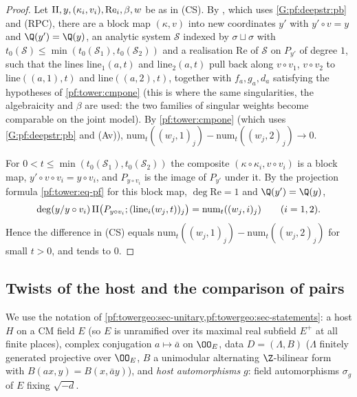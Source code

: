 \begin{proof}
Let $\mathrm{II},y,(\kappa_i,v_i),\mathrm{Re}_i,\beta,w$ be as in (CS). By
, which uses \ref{G:pf:deepstr:pb} and (RPC), there are a
block map $(\kappa,v)$ into new coordinates $y'$ with $y'\circ v=y$ and $\Q(y')=\Q(y)$, an analytic system $\mathcal S$
indexed by $\sigma\sqcup\sigma$ with $t_0(\mathcal S)\le\min(t_0(\mathcal S_1),t_0(\mathcal S_2))$ and a realisation
$\mathrm{Re}$ of $\mathcal S$ on $P_{y'}$ of degree $1$, such that the lines $\mathrm{line}_1(a,t)$ and $\mathrm{line}_2(a,t)$
pull back along $v\circ v_1$, $v\circ v_2$ to $\mathrm{line}((a,1),t)$ and $\mathrm{line}((a,2),t)$, together with $f_a,g_a,d_a$
satisfying the hypotheses of \cref{pf:tower:cmpone} (this is where the same singularities, the algebraicity and $\beta$
are used: the two families of singular weights become comparable on the joint model). By \cref{pf:tower:cmpone} (which uses \ref{G:pf:deepstr:pb} and (Av)),
$\mathrm{num}_t((w_j,1)_j)-\mathrm{num}_t((w_j,2)_j)\to0$.

For $0<t\le\min(t_0(\mathcal S_1),t_0(\mathcal S_2))$ the composite $(\kappa\circ\kappa_i,v\circ v_i)$ is a block map,
$y'\circ v\circ v_i=y\circ v_i$, and $P_{y\circ v_i}$ is the image of $P_{y'}$ under it. By the projection formula
\eqref{pf:tower:eq-pf} for this block map, $\deg\mathrm{Re}=1$ and $\Q(y')=\Q(y)$,
\[
\deg(y/y\circ v_i)\,\mathrm{II}\bigl(P_{y\circ v_i};(\mathrm{line}_i(w_j,t))_j\bigr)=\mathrm{num}_t((w_j,i)_j)\qquad(i=1,2).
\]
Hence the difference in (CS) equals $\mathrm{num}_t((w_j,1)_j)-\mathrm{num}_t((w_j,2)_j)$ for small $t>0$, and tends to $0$.
\end{proof}

\subsection{Twists of the host and the comparison of pairs}\label{pf:tower:sec-twist}

We use the notation of \cref{pf:towergeo:sec-unitary,pf:towergeo:sec-statements}: a host $H$ on a CM field $E$ (so $E$ is
unramified over its maximal real subfield $E^+$ at all finite places), complex conjugation $a\mapsto\bar a$ on $\OO_E$, data
$D=(\Lambda,B)$ ($\Lambda$ finitely generated projective over $\OO_E$, $B$ a unimodular alternating $\Z$-bilinear form with
$B(ax,y)=B(x,\bar ay)$), and \emph{host automorphisms} $g$: field automorphisms $\sigma_g$ of $E$ fixing $\sqrt{-d}$.

